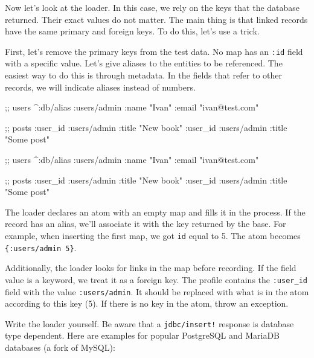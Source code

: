 Now let's look at the loader. In this case, we rely on the keys that the database returned. Their exact values do not matter. The main thing is that linked records have the same primary and foreign keys. To do this, let's use a trick.

First, let's remove the primary keys from the test data. No map has an \verb|:id| field with a specific value. Let's give aliases to the entities to be referenced. The easiest way to do this is through metadata. In the fields that refer to other records, we will indicate aliases instead of numbers.


\ifnarrow

\begin{english}
  \begin{clojure}
;; users
^{:db/alias :users/admin}
 {:name "Ivan" :email "ivan@test.com"}

;; posts
{:user_id :users/admin
 :title "New book"}
{:user_id :users/admin
 :title "Some post"}
  \end{clojure}
\end{english}

\else

\begin{english}
  \begin{clojure}
;; users
^{:db/alias :users/admin}
 {:name "Ivan" :email "ivan@test.com"}

;; posts
{:user_id :users/admin :title "New book"}
{:user_id :users/admin :title "Some post"}
  \end{clojure}
\end{english}

\fi

The loader declares an atom with an empty map and fills it in the process. If the record has an alias, we'll associate it with the key returned by the base. For example, when inserting the first map, we got \verb|id| equal to 5. The atom becomes \verb|{:users/admin 5}|.

Additionally, the loader looks for links in the map before recording. If the field value is a keyword, we treat it as a foreign key. The profile contains the \verb|:user_id| field with the value \verb|:users/admin|. It should be replaced with what is in the atom according to this key (5). If there is no key in the atom, throw an exception.


Write the loader yourself. Be aware that a \verb|jdbc/insert!| response is database type dependent. Here are examples for popular PostgreSQL and MariaDB databases (a fork of MySQL):

